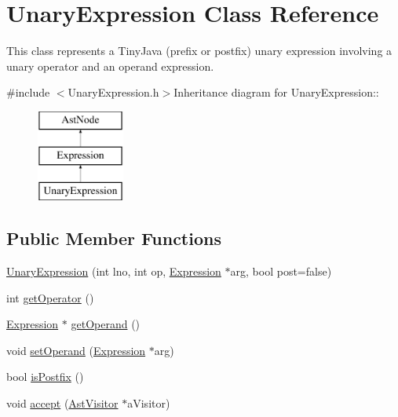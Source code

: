 \hypertarget{classUnaryExpression}{
\section{UnaryExpression Class Reference}
\label{classUnaryExpression}
}


This class represents a TinyJava (prefix or postfix) unary expression involving a unary operator and an operand expression.  


{\ttfamily \#include $<$UnaryExpression.h$>$}Inheritance diagram for UnaryExpression::\begin{figure}[H]
\begin{center}
\leavevmode
\includegraphics[height=3cm]{classUnaryExpression}
\end{center}
\end{figure}
\subsection*{Public Member Functions}
\begin{DoxyCompactItemize}
\item 
\hyperlink{classUnaryExpression_a03b712bd21c8ec768ae8bdd95ef325f0}{UnaryExpression} (int lno, int op, \hyperlink{classExpression}{Expression} $\ast$arg, bool post=false)
\item 
int \hyperlink{classUnaryExpression_a9818b1b3ddfaa787e321ec28fea399dc}{getOperator} ()
\item 
\hyperlink{classExpression}{Expression} $\ast$ \hyperlink{classUnaryExpression_aca23f932e421218f5e260f09acd99b51}{getOperand} ()
\item 
void \hyperlink{classUnaryExpression_a6c05bb27e3025ec166041091e4023eaf}{setOperand} (\hyperlink{classExpression}{Expression} $\ast$arg)
\item 
bool \hyperlink{classUnaryExpression_aa7905d7a0bd4197cb72af72c8218194c}{isPostfix} ()
\item 
void \hyperlink{classUnaryExpression_a555e53bb0a187856275b8d2c885b75d0}{accept} (\hyperlink{classAstVisitor}{AstVisitor} $\ast$aVisitor)
\end{DoxyCompactItemize}


